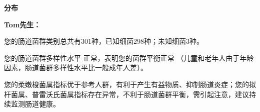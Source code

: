 

\usepackage{graphicx}
\graphicspath{{cores/}}



\setlength{\arrayrulewidth}{0.5pt}
\fontsize{9.3pt}{17pt}\selectfont
\color{gray2}

\vspace*{2mm}
\begin{center}
{\bf\sanhao 分布}
\end{center}

\medskip

\noindent
{\bf\xiaosihao Tom先生：}


\bigskip

您的肠道菌群类别总共有301种，已知细菌298种；未知细菌3种。

您的肠道菌群多样性水平
正常，表明您的菌群平衡正常
（儿童和老年人由于年龄因素，肠道菌群多样性水平比一般成年人差）。

您的柔嫩梭菌属指标优于参考人群，有利于产生有益物质、抑制肠道炎症；您的拟杆菌属、普雷沃氏菌属指标存在异常，不利于肠道菌群平衡，需引起注意，建议持续监测肠道健康。


